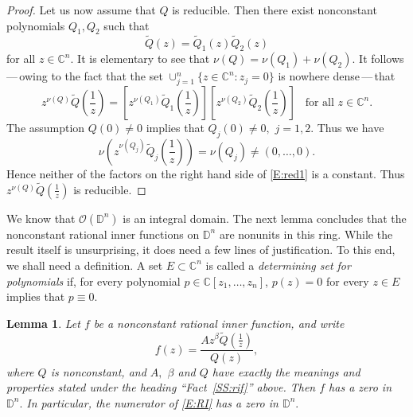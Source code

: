 \documentclass[11pt, reqno]{amsart}
\numberwithin{equation}{section}
\theoremstyle{definition}
\theoremstyle{remark}
\theoremstyle{plain}
\newtheorem{lemma}[definition]{Lemma}
\begin{document}
\begin{proof}
Let us now assume that $Q$ is reducible. Then there exist nonconstant
polynomials $Q_1,Q_2$ such that
\[
\widetilde{Q}(z)=\widetilde{Q}_1(z)\widetilde{Q}_2(z)
\]
for all $z\in{\mathbb{C}^n}.$
It is elementary to see that $\nu(Q)=\nu(Q_1)+\nu(Q_2).$ It follows\,---\,owing to the fact that
 the set $\cup_{j=1}^{n}\{z\in{\mathbb{C}^n}:z_j=0\}$ is nowhere dense\,---\,that
\begin{equation}
z^{\nu(Q)}\widetilde{Q}\left(\frac{1}{z}\right)=
\left[z^{\nu(Q_1)}\widetilde{Q}_1\left(\frac{1}{z}\right)\right]
\left[z^{\nu(Q_2)}\widetilde{Q}_2\left(\frac{1}{z}\right)\right]\;\;\;\text{for all $z\in{\mathbb{C}^n}.$}
\label{E:red1}
\end{equation}
The assumption $Q(0)\neq 0$ implies that $Q_{j}(0)\not=0,\,\,j=1,2.$ Thus we have 
\[
\nu\left(z^{\nu(Q_j)}\widetilde{Q}_j\left(\frac{1}{z}\right)\right)=\nu(Q_j)\not=(0,\ldots,0).
\]
Hence neither of the factors on the right hand side of \eqref{E:red1} is a constant.
Thus $z^{\nu(Q)}\widetilde{Q}\left(\frac{1}{z}\right)$ is reducible.
\end{proof}
\smallskip

We know that ${\mathcal{O}}({\mathbb{D}}^n)$ is an integral domain. The next lemma concludes that the
nonconstant rational inner functions on ${\mathbb{D}}^n$ are nonunits in this ring. While the result itself is unsurprising,
it does need a few lines of justification. To this end,
we shall need a definition. A set $E\subset {\mathbb{C}}^n$ is called a {\em determining set for
polynomials} if, for every polynomial $p\in {\mathbb{C}}[z_1,\dots, z_n]$, $p(z) = 0$ for every
$z\in E$ implies that $p\equiv 0$.

\begin{lemma}\label{L:nu}
Let $f$ be a nonconstant rational inner function, and write
\begin{equation}
f(z)=\frac{Az^{\beta}\widetilde{Q}(\frac{1}{z})}{Q(z)},\label{E:RI}
\end{equation}
where $Q$ is nonconstant, and  $A,$ $\beta$ and $Q$ have exactly the meanings and properties
stated under the heading ``Fact~\ref{SS:rif}'' above. 
Then $f$ has a zero in ${\mathbb{D}}^n.$ In particular, the numerator of \eqref{E:RI} has a zero in ${\mathbb{D}}^n.$
\end{lemma}
\end{document}
